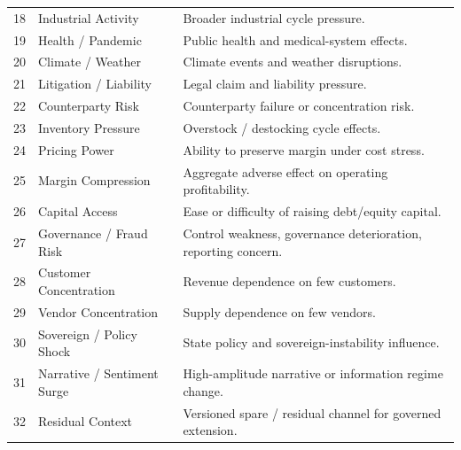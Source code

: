\documentclass[11pt]{report}
\begin{document}
\begin{longtable}{p{}p{}p{}}
18 & Industrial Activity & Broader industrial cycle pressure. \\
19 & Health / Pandemic & Public health and medical-system effects. \\
20 & Climate / Weather & Climate events and weather disruptions. \\
21 & Litigation / Liability & Legal claim and liability pressure. \\
22 & Counterparty Risk & Counterparty failure or concentration risk. \\
23 & Inventory Pressure & Overstock / destocking cycle effects. \\
24 & Pricing Power & Ability to preserve margin under cost stress. \\
25 & Margin Compression & Aggregate adverse effect on operating profitability. \\
26 & Capital Access & Ease or difficulty of raising debt/equity capital. \\
27 & Governance / Fraud Risk & Control weakness, governance deterioration, reporting concern. \\
28 & Customer Concentration & Revenue dependence on few customers. \\
29 & Vendor Concentration & Supply dependence on few vendors. \\
30 & Sovereign / Policy Shock & State policy and sovereign-instability influence. \\
31 & Narrative / Sentiment Surge & High-amplitude narrative or information regime change. \\
32 & Residual Context & Versioned spare / residual channel for governed extension. \\
\bottomrule
\end{longtable}
\end{document}
